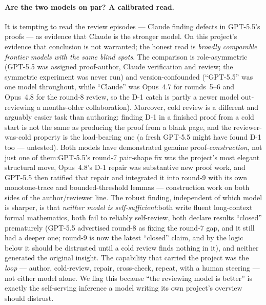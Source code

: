 \documentclass[
]{ceurart}
\theoremstyle{definition}
\begin{document}
\paragraph{Are the two models on par? A calibrated read.}
It is tempting to read the review episodes --- Claude finding
defects in GPT-5.5's proofs --- as evidence that Claude is the
stronger model.  On this project's evidence that conclusion is
not warranted; the honest read is \emph{broadly comparable
frontier models with the same blind spots}.  The comparison is
role-asymmetric (GPT-5.5 was assigned proof-author, Claude
verification and review; the symmetric experiment was never run)
and version-confounded (``GPT-5.5'' was one model throughout,
while ``Claude'' was Opus~4.7 for rounds~5--6 and Opus~4.8 for the
round-8 review, so the D-1 catch is partly a newer model
out-reviewing a months-older collaboration).  Moreover, cold
review is a different and arguably easier task than authoring:\@
finding D-1 in a finished proof from a cold start is not the same
as producing the proof from a blank page, and the
reviewer-was-cold property is the load-bearing one (a fresh
GPT-5.5 might have found D-1 too --- untested).  Both models have
demonstrated genuine proof-\emph{construction}, not just one of
them:\@ GPT-5.5's round-7 pair-shape fix was the project's most
elegant structural move, Opus~4.8's D-1 repair was substantive new
proof work, and GPT-5.5 then ratified that repair and integrated it
into round-9 with its own monotone-trace and bounded-threshold
lemmas --- construction work on both sides of the author/reviewer
line.  The robust finding, independent of which model is sharper, is
that \emph{neither model is self-sufficient}:\@ both write fluent
long-context formal mathematics, both fail to reliably self-review,
both declare results ``closed'' prematurely (GPT-5.5 advertised
round-8 as fixing the round-7 gap, and it still had a deeper one;
round-9 is now the latest ``closed'' claim, and by the logic below
it should be distrusted until a cold review finds nothing in it),
and neither generated the original insight.  The capability that
carried the project was the \emph{loop} --- author, cold-review,
repair, cross-check, repeat, with a human steering --- not either
model alone.  We flag this because ``the reviewing model is
better'' is exactly the self-serving inference a model writing its
own project's overview should distrust.
\end{document}

